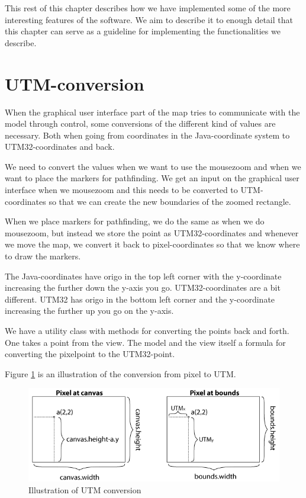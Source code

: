 This rest of this chapter describes how we have implemented some of the more
interesting features of the software. We aim to describe it to enough detail that this
chapter can serve as a guideline for implementing the functionalities we
describe.

\section{UTM-conversion}
\label{IMPL-UTM}
When the graphical user interface part of the map tries to communicate with the
model through control, some conversions of the different kind of values are
necessary. Both when going from coordinates in the Java-coordinate system to
UTM32-coordinates and back.

We need to convert the values when we want to use the mousezoom and when we want
to place the markers for pathfinding. We get an input on the graphical user
interface when we mousezoom and this needs to be converted to UTM-coordinates so
that we can create the new boundaries of the zoomed rectangle.

When we place markers for pathfinding, we do the same as when we do mousezoom,
but instead we store the point as UTM32-coordinates and whenever we move the
map, we convert it back to pixel-coordinates so that we know where to draw the
markers.

The Java-coordinates have origo in the top left corner with the y-coordinate
increasing the further down the y-axis you go. UTM32-coordinates are a bit
different. UTM32 has origo in the bottom left corner and the y-coordinate
increasing the further up you go on the y-axis.

We have a utility class with methods for converting the points back and forth.
One takes a point from the view. The model and the view itself a formula
for converting the pixelpoint to the UTM32-point.

Figure \ref{fig:UTMconversion} is an illustration of the conversion from pixel to UTM.

\begin{figure}[!ht]
\centering
\includegraphics[width=1\linewidth]{images/UTMillu}
\caption{Illustration of UTM conversion}
\label{fig:UTMconversion}
\end{figure}

